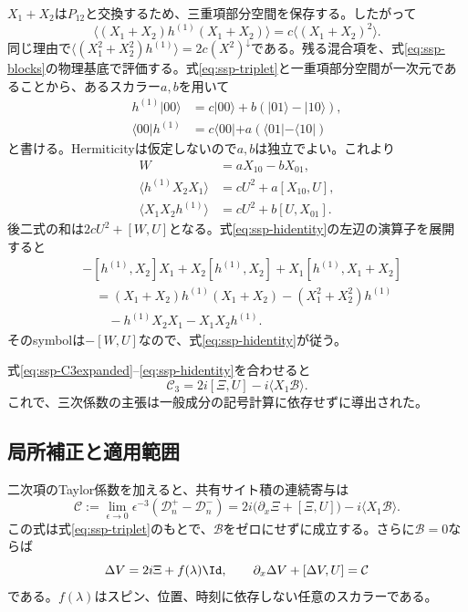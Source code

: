 $X_1+X_2$は$P_{12}$と交換するため、三重項部分空間を保存する。したがって
\begin{equation}
\langle(X_1+X_2)h^{(1)}(X_1+X_2)\rangle
=c\langle(X_1+X_2)^2\rangle.
\label{eq:ssp-hsym}
\end{equation}
同じ理由で$\langle(X_1^2+X_2^2)h^{(1)}\rangle=2c(X^2)^\downarrow$である。残る混合項を、式\eqref{eq:ssp-blocks}の物理基底で評価する。式\eqref{eq:ssp-triplet}と一重項部分空間が一次元であることから、あるスカラー$a,b$を用いて
\begin{align}
h^{(1)}|00\rangle&=c|00\rangle+b(|01\rangle-|10\rangle),\\
\langle00|h^{(1)}&=c\langle00|+a(\langle01|-\langle10|)
\end{align}
と書ける。Hermiticityは仮定しないので$a,b$は独立でよい。これより
\begin{align}
W&=aX_{10}-bX_{01},\\
\langle h^{(1)}X_2X_1\rangle&=cU^2+a[X_{10},U],\\
\langle X_1X_2h^{(1)}\rangle&=cU^2+b[U,X_{01}].
\end{align}
後二式の和は$2cU^2+[W,U]$となる。式\eqref{eq:ssp-hidentity}の左辺の演算子を展開すると
\begin{align}
&-[h^{(1)},X_2]X_1+X_2[h^{(1)},X_2]
+X_1[h^{(1)},X_1+X_2]\nonumber\\
&\quad=(X_1+X_2)h^{(1)}(X_1+X_2)
-(X_1^2+X_2^2)h^{(1)}\nonumber\\
&\qquad-h^{(1)}X_2X_1-X_1X_2h^{(1)}.
\end{align}
そのsymbolは$-[W,U]$なので、式\eqref{eq:ssp-hidentity}が従う。

式\eqref{eq:ssp-C3expanded}--\eqref{eq:ssp-hidentity}を合わせると
\begin{equation}
\mathcal C_3=2i[\Xi,U]-i\langle X_1\mathcal B\rangle.
\label{eq:ssp-C3final}
\end{equation}
これで、三次係数の主張は一般成分の記号計算に依存せずに導出された。

\subsection{局所補正と適用範囲}

二次項のTaylor係数を加えると、共有サイト積の連続寄与は
\begin{equation}
\mathcal C:=\lim_{\epsilon\to0}\epsilon^{-3}
(\mathcal D^+_n-\mathcal D^-_n)
=2i\bigl(\partial_x\Xi+[\Xi,U]\bigr)-i\langle X_1\mathcal B\rangle.
\label{eq:ssp-main}
\end{equation}
この式は式\eqref{eq:ssp-triplet}のもとで、$\mathcal B$をゼロにせずに成立する。さらに$\mathcal B=0$ならば
\begin{equation}
\Delta V=2i\Xi+f(\lambda)\Id,\qquad
\partial_x\Delta V+[\Delta V,U]=\mathcal C
\label{eq:ssp-DeltaV}
\end{equation}
である。$f(\lambda)$はスピン、位置、時刻に依存しない任意のスカラーである。

